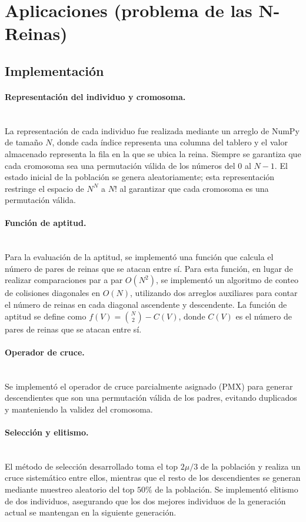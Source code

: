 \documentclass[11pt,a4paper,twocolumn]{article}
\begin{document}
\section{Aplicaciones (problema de las N-Reinas)}
\subsection{Implementación}

\paragraph{Representación del individuo y cromosoma.} ~\\
La representación de cada individuo fue realizada mediante un arreglo de NumPy de tamaño $N$, donde cada índice representa una columna del tablero y el valor almacenado representa la fila en la que se ubica la reina. Siempre se garantiza que cada cromosoma sea una permutación válida de los números del 0 al $N-1$. El estado inicial de la población se genera aleatoriamente; esta representación restringe el espacio de $N^N$ a $N!$ al garantizar que cada cromosoma es una permutación válida.

\paragraph{Función de aptitud.} ~\\
Para la evaluación de la aptitud, se implementó una función que calcula el número de pares de reinas que se atacan entre sí. Para esta función, en lugar de realizar comparaciones par a par $O(N^2)$, se implementó un algoritmo de conteo de colisiones diagonales en $O(N)$, utilizando dos arreglos auxiliares para contar el número de reinas en cada diagonal ascendente y descendente. La función de aptitud se define como $f(V)=\binom{N}{2}-C(V)$, donde $C(V)$ es el número de pares de reinas que se atacan entre sí.

\paragraph{Operador de cruce.} ~\\
Se implementó el operador de cruce parcialmente asignado (PMX) para generar descendientes que son una permutación válida de los padres, evitando duplicados y manteniendo la validez del cromosoma.

\paragraph{Selección y elitismo.} ~\\
El método de selección desarrollado toma el top $2 \mu/3$ de la población y realiza un cruce sistemático entre ellos, mientras que el resto de los descendientes se generan mediante muestreo aleatorio del top $50\%$ de la población. Se implementó elitismo de dos individuos, asegurando que los dos mejores individuos de la generación actual se mantengan en la siguiente generación.
\end{document}
